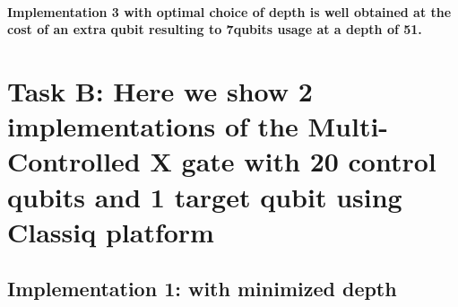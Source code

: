 \documentclass[12pt, letterpaper]{article}
\begin{document}
\paragraph{
Implementation 3 with optimal choice of depth is well obtained at the cost of an extra qubit resulting to 7qubits usage at a depth of 51.}

\newpage

\section{Task B: Here we show 2 implementations of the Multi-Controlled X gate with 20 control qubits and 1 target qubit using Classiq platform}


\subsection{Implementation 1: with minimized depth}
\end{document}
